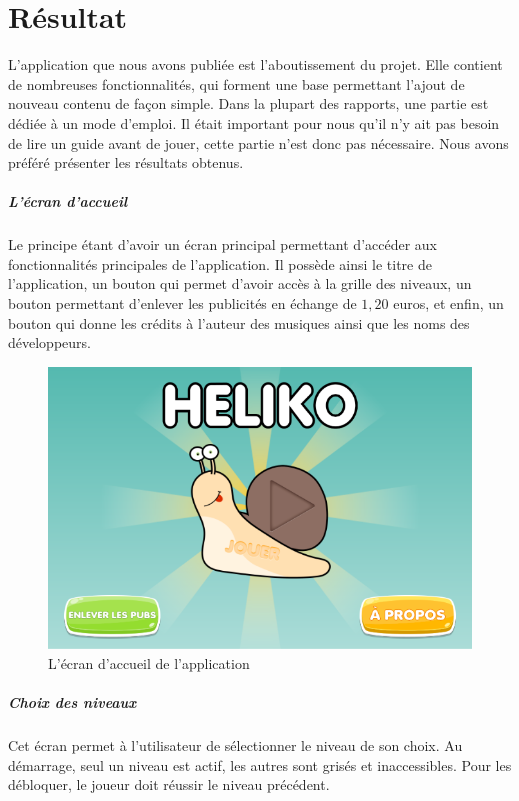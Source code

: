 \chapter{Résultat}


L'application que nous avons publiée est l'aboutissement du projet. Elle contient de nombreuses fonctionnalités, qui forment une base permettant l'ajout de nouveau contenu de façon simple. Dans la plupart des rapports, une partie est dédiée à un mode d'emploi. Il était important pour nous qu'il n'y ait pas besoin de lire un guide avant de jouer, cette partie n'est donc pas nécessaire. Nous avons préféré présenter les résultats obtenus.

\paragraph{L'écran d'accueil} Le principe étant d'avoir un écran principal permettant d'accéder aux fonctionnalités principales de l'application. Il possède ainsi le titre de l'application, un bouton qui permet d'avoir accès à la grille des niveaux, un bouton permettant d'enlever les publicités en échange de $1,20$ euros, et enfin, un bouton qui donne les crédits à l'auteur des musiques ainsi que les noms des développeurs.

\begin{figure}[H]\centering
  \includegraphics[scale=0.6]{./img/resultat_accueil.png}
  \caption{L'écran d'accueil de l'application}
  \label{accueil_appli}
\end{figure}

\paragraph{Choix des niveaux} Cet écran permet à l'utilisateur de sélectionner le niveau de son choix. Au démarrage, seul un niveau est actif, les autres sont grisés et inaccessibles. Pour les débloquer, le joueur doit réussir le niveau précédent.

